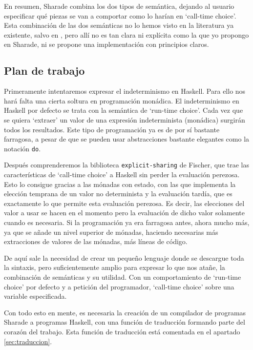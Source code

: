 \documentclass[class=article, crop=false]{standalone}
\begin{document}
En resumen, Sharade combina los dos tipos de semántica, dejando al usuario especificar qué
piezas se van a comportar como lo harían en `call-time choice'. Esta combinación de las dos
semánticas no lo hemos visto en la literatura ya existente, salvo en
\cite{lopez2009flexible}, pero allí no es tan clara ni explícita como la que yo propongo en
Sharade, ni se propone una implementación con principios claros.

\subsection{Plan de trabajo}
Primeramente intentaremos expresar el indeterminismo en Haskell. Para ello nos hará falta una
cierta soltura en programación monádica. El indeterminismo en Haskell por defecto se trata
con la semántica de `run-time choice'. Cada vez que se quiera `extraer' un valor de una
expresión indeterminista (monádica) surgirán todos los resultados. Este tipo de programación
ya es de por sí bastante farragosa, a pesar de que se pueden usar abstracciones bastante
elegantes como la notación \verb`do`.

Después comprenderemos la biblioteca \verb`explicit-sharing` de Fischer, que trae las
características de `call-time choice' a Haskell sin perder la evaluación perezosa. Esto lo
consigue gracias a las mónadas con estado, con las que implementa la elección temprana de un
valor no determinista y la evaluación tardía, que es exactamente lo que permite esta
evaluación perezosa. Es decir, las elecciones del valor a usar se hacen en el momento pero
la evaluación de dicho valor solamente cuando es necesaria. Si la programación ya era
farragosa antes, ahora mucho más, ya que se añade un nivel superior de mónadas, haciendo
necesarias más extracciones de valores de las mónadas, más líneas de código.

De aquí sale la necesidad de crear un pequeño lenguaje donde se descargue toda la sintaxis,
pero suficientemente amplio para expresar lo que nos atañe, la combinación de semánticas y su
utilidad. Con un comportamiento de `run-time choice' por defecto y a petición del
programador, `call-time choice' sobre una variable especificada.

Con todo esto en mente, es necesaria la creación de un compilador de programas Sharade a
programas Haskell, con una función de traducción formando parte del corazón del trabajo. Esta
función de traducción está comentada en el apartado \ref{sec:traduccion}.
\end{document}
